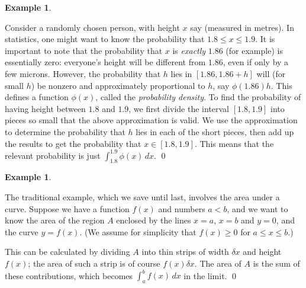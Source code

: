 \documentclass[a4paper]{book}
\newcommand{\RED}[1]{{\color{red}#1}}
\newcommand{\PURPLE}[1]{{\color{purple}#1}}
\newcommand{\dl}        {\delta}
\renewcommand{\:}{\colon}
\newcommand{\bilabel}[1]{\hypertarget{#1}{\label{#1}}}
\newcommand{\EMPH}[1]{\RED{\emph{#1}}}
\newcommand{\DEFN}[1]{\PURPLE{\emph{#1}}}
\theoremstyle{definition}
\newtheorem{example}[theorem]{Example}
\begin{document}
\begin{example}\bilabel{eg-pdf}
 Consider a randomly chosen person, with height $x$ say (measured in
 metres).  In statistics, one might want to know the probability that
 $1.8\leq x\leq 1.9$.  It is important to note that the probability
 that $x$ is \EMPH{exactly} $1.86$ (for example) is essentially zero:
 everyone's height will be different from $1.86$, even if only by a
 few microns.  However, the probability that $h$ lies in
 $[1.86,1.86+h]$ will (for small $h$) be nonzero and approximately
 proportional to $h$, say $\phi(1.86)h$.  This defines a function
 $\phi(x)$, called the \DEFN{probability density}.  To find the
 probability of having height between $1.8$ and $1.9$, we first divide
 the interval $[1.8,1.9]$ into pieces so small that the above
 approximation is valid.  We use the approximation to determine the
 probability that $h$ lies in each of the short pieces, then add up
 the results to get the probability that $x\in[1.8,1.9]$.  This means
 that the relevant probability is just $\int_{1.8}^{1.9}\phi(x)\,dx$.
 \qed
\end{example}
\begin{example}\bilabel{eg-area}
 The traditional example, which we save until last, involves the area
 under a curve.  Suppose we have a function $f(x)$ and numbers $a<b$,
 and we want to know the area of the region $A$ enclosed by the lines
 $x=a$, $x=b$ and $y=0$, and the curve $y=f(x)$.  (We assume for
 simplicity that $f(x)\geq 0$ for $a\leq x\leq b$.)  
 \begin{center}
 \end{center}
 This can be calculated by dividing $A$ into thin strips of width
 $\dl x$ and height $f(x)$; the area of such a strip is of course
 $f(x)\dl x$.  The area of $A$ is the sum of these contributions,
 which becomes $\int_a^b f(x)\,dx$ in the limit.
 \qed
\end{example}
\end{document}
